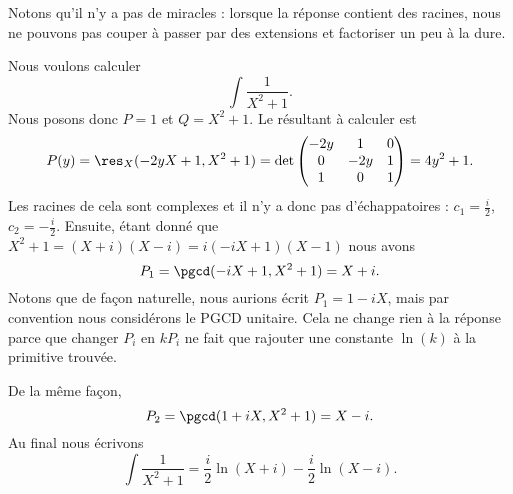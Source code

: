 Notons qu'il n'y a pas de miracles : lorsque la réponse contient des racines, nous ne pouvons pas couper à passer par des extensions et factoriser un peu à la dure.

\begin{example} \label{ExYQODuyU}
    Nous voulons calculer
    \begin{equation}
        \int\frac{ 1 }{ X^2+1 }.
    \end{equation}
    Nous posons donc \( P=1\) et \( Q=X^2+1\). Le résultant à calculer est
    \begin{subequations}
        \begin{align}
            P(y)=\res_X(-2yX+1,X^2+1)=\det\begin{pmatrix}
                -2y    &   1    &   0    \\
                0    &   -2y    &   1    \\
                1    &   0    &   1
            \end{pmatrix}=4y^2+1.
        \end{align}
    \end{subequations}
    Les racines de cela sont complexes et il n'y a donc pas d'échappatoires : \( c_1=\frac{ i }{2}\), \( c_2=-\frac{ i }{2}\). Ensuite, étant donné que \( X^2+1=(X+i)(X-i)=i(-iX+1)(X-1)\) nous avons
    \begin{equation}
        P_1=\pgcd(-iX+1,X^2+1)=X+i.
    \end{equation}
    Notons que de façon naturelle, nous aurions écrit \( P_1=1-iX\), mais par convention nous considérons le PGCD unitaire. Cela ne change rien à la réponse parce que changer \( P_i\) en \( kP_i\) ne fait que rajouter une constante \( \ln(k)\) à la primitive trouvée.

    De la même façon,
    \begin{equation}
        P_2=\pgcd(1+iX,X^2+1)=X-i.
    \end{equation}
    Au final nous écrivons
    \begin{equation}
        \int\frac{1}{ X^2+1 }=\frac{ i }{2}\ln(X+i)-\frac{ i }{2}\ln(X-i).
    \end{equation}
\end{example}

